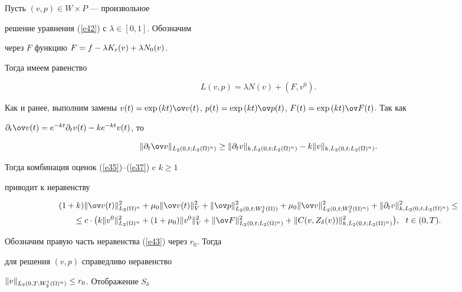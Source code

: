 \begin{pf}


Пусть $(v,p)\in W\times P$ --- произвольное


решение уравнения (\ref{e42}) с $\lambda\in [0,1]$. Обозначим


через $F$ функцию $F=f-\lambda K_{\varepsilon}(v)+\lambda N_0(v)$.


Тогда имеем равенство


$$


L(v,p)=\lambda N(v)+(F,v^0).


$$


Как и ранее, выполним замены $v(t)=\exp{(kt)}\ov v(t)$, $p(t)=


\exp{(kt)}\ov p(t)$, $F(t)=\exp{(kt)}\ov F(t)$. Так как


$\partial_t \ov v(t)=e^{-kt}\partial_t v(t)-ke^{-kt}v(t)$, то


$$


\|\partial_t \ov v\|_{L_2(0,t;L_2(\Om)^n)} \ge \|\partial_t


v\|_{k,L_2(0,t;L_2(\Om)^n)}-k \|v\|_{k,L_2(0,t;L_2(\Om)^n)}.


$$


Тогда комбинация оценок (\ref{e35})--(\ref{e37}) c $k \ge 1$


приводит к неравенству


\begin{multline*}


(1+k)\|\ov v(t)\|_{L_2(\Om)^n}^2+\mu_0 \|\ov v(t)\|_V^2


+\|\ov p\|_{L_2(0,t;W_2^1(\Om))}^2 +\mu_0 \|\ov


v\|_{L_2(0,t;W_2^2(\Om)^n)}^2+ \|\partial_t


v\|_{k,L_2(0,t;L_2(\Om)^n)}^2\le\\


%


\le c \cdot \big(k\| v^0\|_{L_2(\Om)^n}^2+(1+


\mu_0)\|v^0\|_V^2+\|\ov F\|_{L_2(0,t;L_2(\Om)^n)}^2 +\|C(v,


Z_{\delta}(v))\|_{k,L_2(0,t;L_2(\Om)^n)}^2 \big),\ \ t \in(0,T).


\end{multline*}


Обозначим правую часть неравенства (\ref{e43}) через $r_0$. Тогда


для решения $(v,p)$ справедливо неравенство


$\|v\|_{L_2(0,T;W_2^1(\Omega)^n)} \le r_0$. Отображение $S_{\delta}$



\end{pf}
